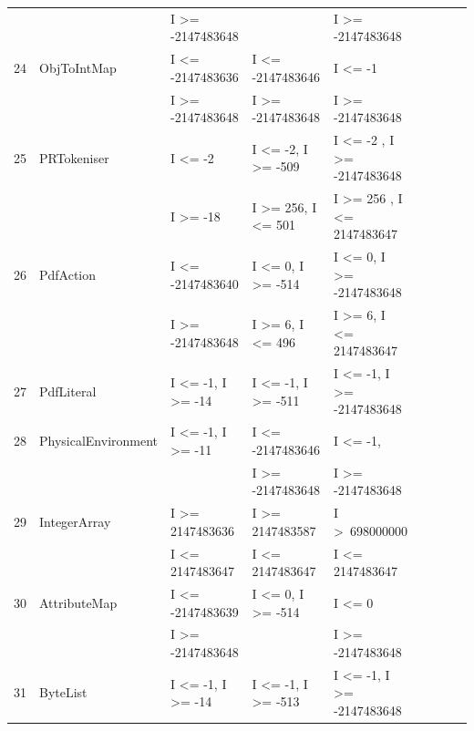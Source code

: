 \begin{table}[h]
{{\begin{tabular}{|l|l|l|l|l|l|l|l|l|}
	&                                             & I \textgreater= -2147483648				& 										& I \textgreater= -2147483648				\\	
24	& ObjToIntMap				& I \textless= -2147483636					& I \textless= -2147483646				& I \textless= -1								\\ 
	&                                             & I \textgreater= -2147483648				& I \textgreater= -2147483648			& I \textgreater= -2147483648			   	\\	
25	& PRTokeniser				& I \textless= -2								& I \textless= -2, I \textgreater= -509		& I \textless= -2 , I \textgreater= -2147483648\\ 
	&                                             & I \textgreater= -18							& I \textgreater= 256, I \textless= 501		& I \textgreater= 256	, I \textless= 2147483647\\
26	& PdfAction					& I \textless= -2147483640 					& I \textless= 0, I \textgreater= -514		& I \textless= 0, I \textgreater= -2147483648 	\\ 
	&                                             & I \textgreater= -2147483648				& I \textgreater= 6, I \textless= 496		& I \textgreater= 6,  I \textless= 2147483647	\\	
27	& PdfLiteral					& I \textless= -1, I \textgreater= -14			& I \textless= -1, I \textgreater= -511		& I \textless= -1, I \textgreater= -2147483648	\\ 
28	& PhysicalEnvironment		& I \textless= -1, I \textgreater= -11			& I \textless= -2147483646				& I \textless= -1, 							\\ 
	& 							& 											& I \textgreater= -2147483648 			& I \textgreater= -2147483648				\\ 
29	& IntegerArray				& I \textgreater= 2147483636				& I \textgreater= 2147483587			& I \textgreater~698000000					\\ 
	&                                             & I \textless= 2147483647					& I \textless= 2147483647				&  I \textless= 2147483647					\\	
30	& AttributeMap				& I \textless= -2147483639					& I \textless= 0, I \textgreater= -514		& I \textless= 0								\\ 
	&                                             & I \textgreater= -2147483648				& 										& I \textgreater= -2147483648 			   	\\	
31	& ByteList					& I \textless= -1, I \textgreater= -14			& I \textless= -1, I \textgreater= -513		& I \textless= -1, I \textgreater= -2147483648	\\ 

\end{tabular}}}
\end{table}
